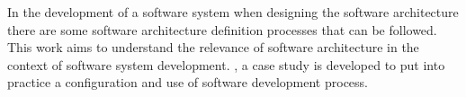 In the development of a software system when designing the software architecture there are some software architecture definition processes that can be followed. This work aims to understand the relevance of software architecture in the context of software system development. , a case study is developed to put into practice
a configuration and use of software development process.